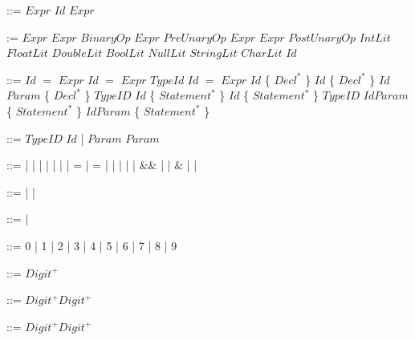\documentclass{article}
\begin{document}
\begin{grammar}
	 ::= $Expr$\glit{;}
	\alt $Id$ \glit{=} $Expr$\glit{;} %
	
	 := \glit{(}$Expr$\glit{)}
	\alt $Expr$ $BinaryOp$ $Expr$
	\alt $PreUnaryOp$ $Expr$
	\alt $Expr$ $PostUnaryOp$
	\alt $IntLit$
	\alt $FloatLit$
	\alt $DoubleLit$
	\alt $BoolLit$
	\alt $NullLit$
	\alt $StringLit$
	\alt $CharLit$
	\alt $Id$
	
	 ::=  $Id$ $=$ $Expr$\glit{;}
	\alt {}  $Id$ $=$ $Expr$\glit{;}
	\alt $TypeId$ $Id$ $=$ $Expr$\glit{;}
	\alt {} $Id$ \{ $Decl^*$ \}
	\alt {} $Id$\glit{()} \{ $Decl^*$ \}
	\alt {} $Id$\glit{(}$Param$\glit{)} \{ $Decl^*$ \}
	\alt $TypeID$ $Id$\glit{()} \{ $Statement^*$ \}
	\alt {} $Id$\glit{()} \{ $Statement^*$ \}
	\alt $TypeID$ $Id$\glit{(}$Param$\glit{)} \{ $Statement^*$ \}
	\alt {} $Id$\glit{(}$Param$\glit{)} \{ $Statement^*$ \}
	
	 ::= $TypeID$ $Id$ | $Param$\glit{,} $Param$
	
	 ::= \glit{+} | \glit{-} | \glit{*} | \glit{/} | \glit{\%} | \glit{\textless} | \glit{\textgreater} | \glit{\textless}= | \glit{\textgreater}= | \glit{==} | \glit{!=} | \glit{+=} | \glit{-=} | \glit{\textbar\textbar} 
	\alt $\&\&$ | \glit{\textbar} | $\&$ | \glit{\textless\textless} | \glit{\textgreater\textgreater}
	
	 ::= \glit{-} | \glit{!} | \glit{\#}
	
	 ::= \glit{++} | \glit{--}

	 ::= 0 | 1 | 2 | 3 | 4 | 5 | 6 | 7 | 8 | 9

	 ::= $Digit^+$
	
	 ::= $Digit^+$$Digit^+$
	
	 ::= $Digit^+$$Digit^+$
	
\end{grammar}
\newpage
\end{document}
